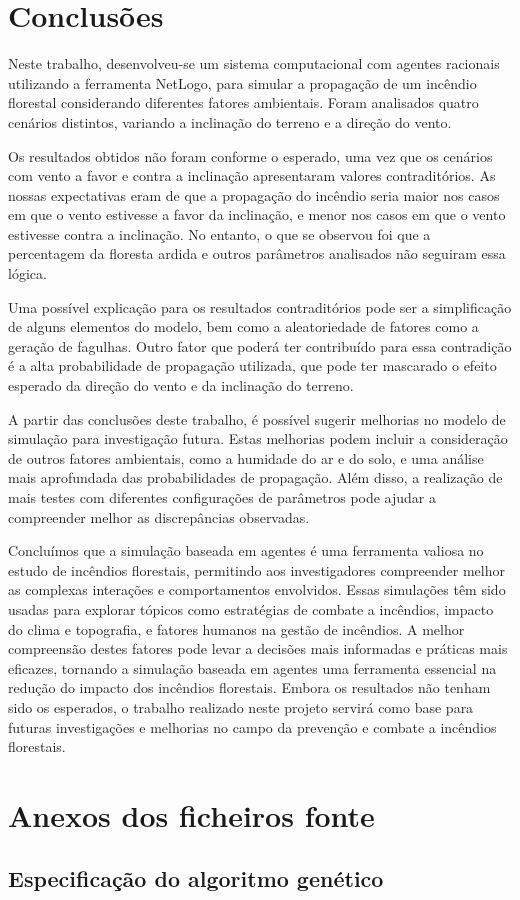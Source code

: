 \documentclass[a4paper, portuguese]{report}
\begin{document}
    \chapter{Conclusões}\label{ch:conclusoes}
    Neste trabalho, desenvolveu-se um sistema computacional com agentes racionais utilizando a ferramenta NetLogo, para simular a propagação de um incêndio florestal considerando diferentes fatores ambientais.
    Foram analisados quatro cenários distintos, variando a inclinação do terreno e a direção do vento.

    Os resultados obtidos não foram conforme o esperado, uma vez que os cenários com vento a favor e contra a inclinação apresentaram valores contraditórios.
    As nossas expectativas eram de que a propagação do incêndio seria maior nos casos em que o vento estivesse a favor da inclinação, e menor nos casos em que o vento estivesse contra a inclinação.
    No entanto, o que se observou foi que a percentagem da floresta ardida e outros parâmetros analisados não seguiram essa lógica.

    Uma possível explicação para os resultados contraditórios pode ser a simplificação de alguns elementos do modelo, bem como a aleatoriedade de fatores como a geração de fagulhas.
    Outro fator que poderá ter contribuído para essa contradição é a alta probabilidade de propagação utilizada, que pode ter mascarado o efeito esperado da direção do vento e da inclinação do terreno.

    A partir das conclusões deste trabalho, é possível sugerir melhorias no modelo de simulação para investigação futura.
    Estas melhorias podem incluir a consideração de outros fatores ambientais, como a humidade do ar e do solo, e uma análise mais aprofundada das probabilidades de propagação.
    Além disso, a realização de mais testes com diferentes configurações de parâmetros pode ajudar a compreender melhor as discrepâncias observadas.

    Concluímos que a simulação baseada em agentes é uma ferramenta valiosa no estudo de incêndios florestais, permitindo aos investigadores compreender melhor as complexas interações e comportamentos envolvidos.
    Essas simulações têm sido usadas para explorar tópicos como estratégias de combate a incêndios, impacto do clima e topografia, e fatores humanos na gestão de incêndios.
    A melhor compreensão destes fatores pode levar a decisões mais informadas e práticas mais eficazes, tornando a simulação baseada em agentes uma ferramenta essencial na redução do impacto dos incêndios florestais.
    Embora os resultados não tenham sido os esperados, o trabalho realizado neste projeto servirá como base para futuras investigações e melhorias no campo da prevenção e combate a incêndios florestais.

    \appendix


    \chapter{Anexos dos ficheiros fonte}\label{ch:appendix}


    \section{Especificação do algoritmo genético}\label{sec:model_spec}
    \inputminted[breaklines]{python}{../src/genalg.py}
    
    
\end{document}
